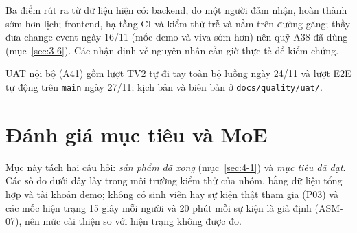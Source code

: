 Ba điểm rút ra từ dữ liệu hiện có: backend, do một người đảm nhận, hoàn thành sớm hơn lịch; frontend, hạ tầng CI và kiểm thử trễ và nằm trên đường găng; thầy đưa change event ngày 16/11 (mốc demo và viva sớm hơn) nên quỹ A38 đã dùng (mục~\ref{sec:3-6}). Các nhận định về nguyên nhân cần giờ thực tế để kiểm chứng.

UAT nội bộ (A41) gồm lượt TV2 tự đi tay toàn bộ luồng ngày 24/11 và lượt E2E tự động trên \texttt{main} ngày 27/11; kịch bản và biên bản ở \texttt{docs/\allowbreak quality/\allowbreak uat/}.


\section{Đánh giá mục tiêu và MoE}
\label{sec:4-3}

Mục này tách hai câu hỏi: \emph{sản phẩm đã xong} (mục~\ref{sec:4-1}) và \emph{mục tiêu đã đạt}. Các số đo dưới đây lấy trong môi trường kiểm thử của nhóm, bằng dữ liệu tổng hợp và tài khoản demo; không có sinh viên hay sự kiện thật tham gia (P03) và các mốc hiện trạng 15 giây mỗi người và 20 phút mỗi sự kiện là giả định (ASM-07), nên mức cải thiện so với hiện trạng không được đo.

